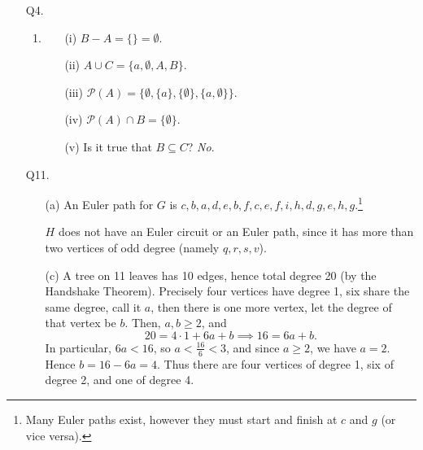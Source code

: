 \documentclass[a4paper,11pt]{article}
\begin{document}
\begin{enumerate}
\item[Q4.]
\begin{enumerate}
\item
\begin{enumerate}
\item[(i)] $B - A = \{\} = \emptyset$.
\item[(ii)] $A \cup C = \{a, \emptyset, A, B\}$.
\item[(iii)] $\mathcal{P}(A) = \{\emptyset, \{a\}, \{\emptyset\}, \{a, \emptyset\}\}$.
\item[(iv)] $\mathcal{P}(A) \cap B = \{\emptyset\}$.
\item[(v)] Is it true that $B \subseteq C$? {\em No}.
\end{enumerate}
\end{enumerate}

\item[Q11.]
\begin{enumerate}
\item[(a)]
An Euler path for $G$ is $c, b, a, d, e, b, f, c, e, f, i, h, d, g, e, h, g$.\footnote{Many
Euler paths exist, however they must start and finish at $c$ and $g$ (or vice versa).}

$H$ does not have an Euler circuit or an Euler path, since it has more than
two vertices of odd degree (namely $q, r, s, v$).

\item[(c)]
A tree on 11 leaves has 10 edges, hence total degree 20 (by the Handshake
Theorem). Precisely four vertices have degree 1, six share the same degree,
call it $a$, then there is one more vertex, let the degree of that vertex be
$b$. Then, $a, b \geq 2$, and
\[
    20 = 4 \cdot 1 + 6a + b \implies 16 = 6a + b.
\]
In particular, $6a < 16$, so $a < \frac{16}{6} < 3$, and since $a \geq 2$, we have $a = 2$.
Hence $b = 16 - 6a = 4$. Thus there are four vertices of degree 1,
six of degree 2, and one of degree 4.
\end{enumerate}


\end{enumerate}
\end{document}
